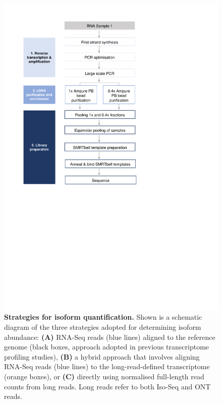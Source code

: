 \begin{figure}[htp]
	\begin{center}
		\includegraphics[page=8,trim={2cm 19cm 2cm 1cm},clip, scale = 0.8]{Figures/ProjectDevelopment_Figures.pdf}
	\end{center}
	\captionsetup{width=0.95\textwidth}
	\caption[Strategies for isoform quantification]%
	{\textbf{Strategies for isoform quantification.} Shown is a schematic diagram of the three strategies adopted for determining isoform abundance: \textbf{(A)} RNA-Seq reads (blue lines) aligned to the reference genome (black boxes, approach adopted in previous transcriptome profiling studies), \textbf{(B)} a hybrid approach that involves aligning RNA-Seq reads (blue lines) to the long-read-defined transcriptome (orange boxes), or \textbf{(C)} directly using normalised full-length read counts from long reads. Long reads refer to both Iso-Seq and ONT reads.}
	\label{fig:isoform_quant_strategy}
\end{figure}


